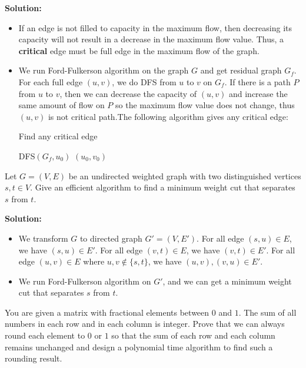 \documentclass{article}
\newcounter{exercise}
\newcommand{\<}{
    \langle}
\renewcommand{\>}{
    \rangle}
\begin{document}
{\textbf{Solution:}
\begin{itemize}
    \item If an edge is not filled to capacity in the maximum flow, then decreasing its capacity will not result in a decrease in the maximum flow value. Thus, a \textbf{critical} edge must be full edge in the maximum flow of the graph.
    \item We run Ford-Fulkerson algorithm on the graph $G$ and get residual graph $G_f$. For each full edge $(u,v)$, we do DFS from $u$ to $v$ on $G_f$. If there is a path $P$ from $u$ to $v$, then we can decrease the capacity of $(u,v)$ and increase the same amount of flow on $P$ so the maximum flow value does not change, thus $(u,v)$ is not critical path.The following algorithm gives any critical edge:
    \begin{algorithm}[htb]
        \caption{Find any critical edge}
        \begin{algorithmic}[1]
                \State DFS$(G_f,u_0)$
                \State
                    \Return $(u_0,v_0)$
                \EndIf
            \EndFor
        \end{algorithmic}
    \end{algorithm}
\end{itemize}
\newpage


\begin{exercise}
Let $G=(V,E)$ be an undirected weighted graph with two distinguished vertices $s,t\in V$. Give an efficient algorithm to find a minimum weight cut that separates $s$ from $t$.
\end{exercise}

\textbf{Solution:}
\begin{itemize}
    \item We transform $G$ to directed graph $G'=(V,E')$. For all edge $(s,u)\in E$, we have $(s,u)\in E'$. For all edge $(v,t)\in E$, we have $(v,t)\in E'$. For all edge $(u,v)\in E$ where $u,v\notin\{s,t\}$, we have $(u,v),(v,u)\in E'$. 
    \item We run Ford-Fulkerson algorithm on $G'$, and we can get a minimum weight cut that separates $s$ from $t$.
\end{itemize}
\newpage


\begin{exercise}
You are given a matrix with fractional elements between $0$ and $1$. The sum of all numbers in each row and in each column is integer. Prove that we can always round each element to $0$ or $1$ so that the sum of each row and each column remains unchanged and design a polynomial time algorithm to find such a rounding result.
\end{exercise}

}
\end{document}
